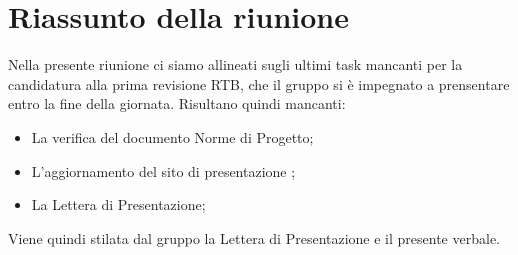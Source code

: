 \section{Riassunto della riunione}
Nella presente riunione ci siamo allineati sugli ultimi task mancanti per la candidatura alla prima revisione RTB, che il gruppo si è impegnato a prensentare entro la fine della giornata. Risultano quindi mancanti:
\begin{itemize}
    \item La verifica del documento Norme di Progetto;
    \item L'aggiornamento del sito di presentazione ;
    \item La Lettera di Presentazione;
\end{itemize}

Viene quindi stilata dal gruppo la Lettera di Presentazione e il presente verbale.